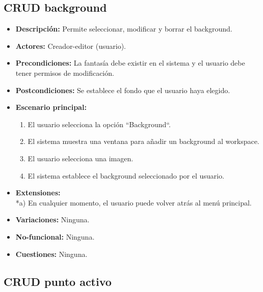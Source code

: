 \subsection{CRUD background}
\begin{itemize}
	\item \textbf{Descripción:} Permite seleccionar, modificar y borrar el background.
	\item \textbf{Actores:} Creador-editor (usuario).
	\item \textbf{Precondiciones:} La fantasía debe existir en el sistema y el usuario debe tener permisos de modificación.
	\item \textbf{Postcondiciones:} Se establece el fondo que el usuario haya elegido.
	\item \textbf{Escenario principal:}
	\begin{enumerate}
		\item El usuario selecciona la opción ``Background``.
		\item El sistema muestra una ventana para añadir un background al workspace.
		\item El usuario selecciona una imagen. %
		\item El sistema establece el background seleccionado por el usuario.
	\end{enumerate}
	\item \textbf{Extensiones:} \\ *a) En cualquier momento, el usuario puede volver atrás al menú principal. 
	\item \textbf{Variaciones:} Ninguna.
	\item \textbf{No-funcional:} Ninguna.
	\item \textbf{Cuestiones:} Ninguna.
\end{itemize}


\subsection{CRUD punto activo}
